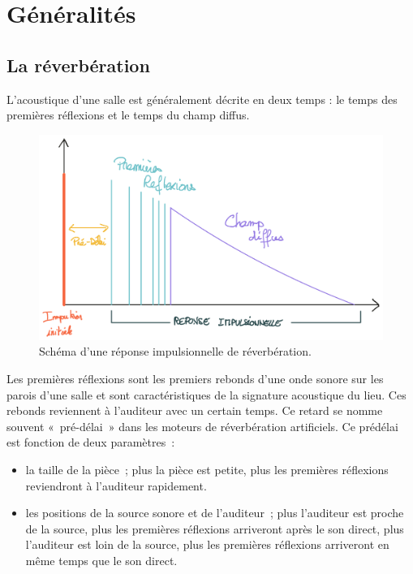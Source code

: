 \documentclass[
]{book}
\providecommand{\tightlist}{%
  \setlength{\itemsep}{0pt}\setlength{\parskip}{0pt}}
\begin{document}
\hypertarget{guxe9nuxe9ralituxe9s}{%
\section{Généralités}\label{guxe9nuxe9ralituxe9s}}

\hypertarget{la-ruxe9verbuxe9ration}{%
\subsection{La réverbération}\label{la-ruxe9verbuxe9ration}}

L'acoustique d'une salle est généralement décrite en deux temps : le temps des premières réflexions et le temps du champ diffus.

\begin{figure}

{\centering \includegraphics{_resources/drawings/reverb} 

}

\caption{Schéma d'une réponse impulsionnelle de réverbération.}\label{fig:unnamed-chunk-10}
\end{figure}

Les premières réflexions sont les premiers rebonds d'une onde sonore sur les parois d'une salle et sont caractéristiques de la signature acoustique du lieu. Ces rebonds reviennent à l'auditeur avec un certain temps. Ce retard se nomme souvent «~pré-délai~» dans les moteurs de réverbération artificiels. Ce prédélai est fonction de deux paramètres~:

\begin{itemize}
\tightlist
\item
  la taille de la pièce~; plus la pièce est petite, plus les premières réflexions reviendront à l'auditeur rapidement.
\item
  les positions de la source sonore et de l'auditeur~; plus l'auditeur est proche de la source, plus les premières réflexions arriveront après le son direct, plus l'auditeur est loin de la source, plus les premières réflexions arriveront en même temps que le son direct.
\end{itemize}
\end{document}
